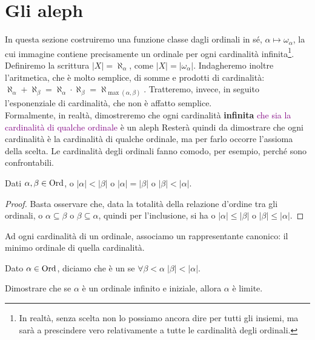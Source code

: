 \section{Gli aleph}
In questa sezione costruiremo una funzione classe dagli ordinali in sé, $\alpha \mapsto \omega_\alpha$, la cui immagine contiene precisamente un ordinale per ogni cardinalità infinita\footnote{In realtà, senza scelta non lo possiamo ancora dire per tutti gli insiemi, ma sarà a prescindere vero relativamente a tutte le cardinalità degli ordinali.}.
Definiremo la scrittura $|X| = \aleph_\alpha$, come $|X| = |\omega_\alpha|$. Indagheremo inoltre l'aritmetica, che è molto semplice, di somme e prodotti di cardinalità: $\aleph_\alpha + \aleph_\beta = \aleph_\alpha \cdot \aleph_\beta = \aleph_{\max(\alpha,\beta)}$.
Tratteremo, invece, in seguito l'esponenziale di cardinalità, che non è affatto semplice.\\
Formalmente, in realtà, dimostreremo che ogni cardinalità \textbf{infinita} \textcolor{purple}{che sia la cardinalità di qualche ordinale} è un aleph
Resterà quindi da dimostrare che ogni cardinalità è la cardinalità di qualche ordinale, ma per farlo occorre l'assioma della scelta.
Le cardinalità degli ordinali fanno comodo, per esempio, perché sono confrontabili.

\begin{remark}
	Dati $\alpha,\beta \in \operatorname{Ord}$, o $|\alpha| < |\beta|$ o $|\alpha| = |\beta|$ o $|\beta| < |\alpha|$.
\end{remark}

\begin{proof}
	Basta osservare che, data la totalità della relazione d'ordine tra gli ordinali, o $\alpha \subseteq \beta$ o $\beta \subseteq \alpha$, quindi per l'inclusione, si ha o $|\alpha| \leq |\beta|$ o $|\beta| \leq |\alpha|$.
\end{proof}

Ad ogni cardinalità di un ordinale, associamo un rappresentante canonico: il minimo ordinale di quella cardinalità.

\begin{definition}
	Dato $\alpha \in \operatorname{Ord}$, diciamo che è un  se $\forall \beta < \alpha \; |\beta| < |\alpha|$.
\end{definition}

\begin{exercise}
	Dimostrare che se $\alpha$ è un ordinale infinito e iniziale, allora $\alpha$ è limite.
\end{exercise}

